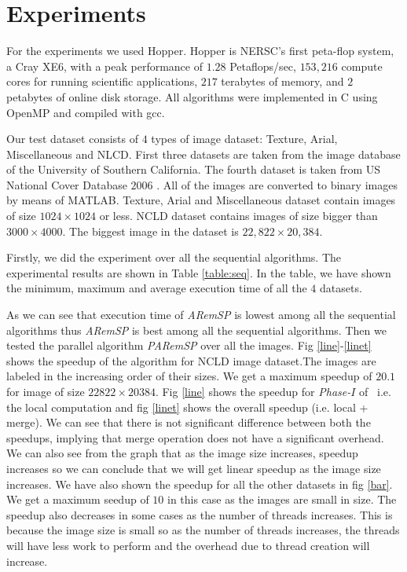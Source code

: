 \section{Experiments}
\label{sec:experiments}



For the experiments we used Hopper. Hopper is NERSC's first peta-flop system, a
Cray XE6, with a peak performance of $1.28$ Petaflops/sec, $153,216$ compute
cores for running scientific applications, $217$ terabytes of memory, and $2$
petabytes of online disk storage. All algorithms were implemented in C using OpenMP and compiled with gcc.

Our test dataset consists of $4$ types of image dataset: Texture, Arial,
Miscellaneous and NLCD. First three datasets are taken from the image database of the University of 
Southern California\cite{}. The fourth dataset is taken from US National Cover Database
$2006$ \cite{}. All of the images are converted to binary images by means of MATLAB.
Texture, Arial and Miscellaneous dataset contain images of size $1024 \times
1024$ or less.
NCLD dataset contains images of size bigger than $3000 \times
4000$. The biggest image in the dataset is $22,822 \times 20,384$.

Firstly, we did the experiment over all the sequential algorithms. The
experimental results are shown in Table \ref{table:seq}. In the table, we have
shown the minimum, maximum and average execution time of all the $4$ datasets. 

As we can see that execution time of {\em ARemSP} is lowest among all
the sequential algorithms thus {\em ARemSP} is best among all the sequential
algorithms.
Then we tested the parallel algorithm {\em PARemSP} over all the images.
Fig \ref{line}-\ref{linet} shows the speedup of the algorithm for 
NCLD image dataset.The images are labeled in the increasing order of their
sizes. We get a maximum speedup of $20.1$ for image of size $22822 \times 20384$.
Fig \ref{line} shows the speedup for {\em Phase-$I$} of \paremsp\ i.e. 
the local computation and fig \ref{linet} shows the overall speedup (i.e. local + merge). We can see that there is not 
significant difference between both the speedups, implying that merge operation
does not have a significant overhead. 
We can also see from the graph that as the image size increases, speedup
increases so we can conclude that we will get linear speedup as the image size
increases. We have also shown the speedup for all the other datasets in fig
\ref{bar}.
We get a maximum seedup of $10$ in this case as the images are small in size.
The speedup also decreases in some cases as the number of threads increases.
This is because the image size is small so as the number of threads increases,
the threads will have less work to perform and the overhead due to thread
creation will increase.


